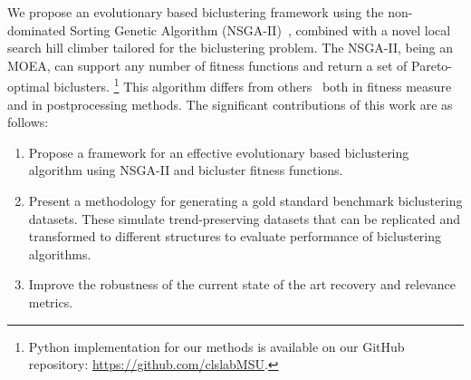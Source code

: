 We propose an evolutionary based biclustering framework using the non-dominated Sorting Genetic Algorithm (NSGA-II)~\cite{deb2002fast}, combined with a novel local search hill climber tailored for the biclustering problem. The NSGA-II, being an MOEA, can support any number of fitness functions and return a set of Pareto-optimal biclusters.
\footnote{Python implementation for our methods is available on our GitHub repository: \url{https://github.com/clslabMSU}.}
This algorithm differs from others~\cite{pontes2013configurable, mitra2006multi} both in fitness measure and in postprocessing methods.
The significant contributions of this work are as follows:
\begin{enumerate}
    \item Propose a framework for an effective evolutionary based biclustering algorithm using NSGA-II and bicluster fitness functions.
    \item Present a methodology for generating a gold standard benchmark biclustering datasets. These simulate trend-preserving datasets that can be replicated and transformed to different structures to evaluate performance of biclustering algorithms.
    \item Improve the robustness of the current state of the art recovery and relevance metrics. 
\end{enumerate}




